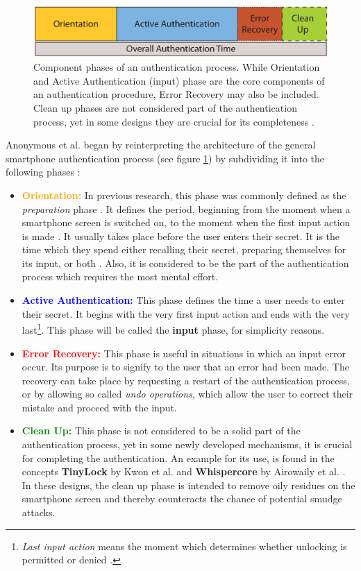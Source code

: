 \begin{figure}[t!]
\centering
\includegraphics[width=13cm, height=2cm]{Chapters/graphics/Phases.PNG}
\caption{Component phases of an authentication process. While Orientation and Active Authentication (input) phase are the core components of an authentication procedure, Error Recovery may also be included. Clean up phases are not considered part of the authentication process, yet in some designs they are crucial for its completeness \cite{anonymous}. }
\label{fig:phases}
\end{figure}

Anonymous et al. \cite{anonymous} began by reinterpreting the architecture of the general smartphone authentication process (see figure \ref{fig:phases}) by subdividing it into the following phases \cite{anonymous}: 

\begin{itemize}
    \item \textbf{\textcolor{orange}{Orientation:}} In previous research, this phase was commonly defined as the \textit{preparation} phase . It defines the period, beginning from the moment when a smartphone screen is switched on, to the moment when the first input action is made . It usually takes place before the user enters their secret. It is the time which they spend either recalling their secret, preparing themselves for its input, or both . Also, it is considered to be the part of the authentication process which requires the most mental effort.  
    \item \textbf{\textcolor{blue}{Active Authentication:}} This phase defines the time a user needs to enter their secret. It begins with the very first input action and ends with the very last\footnote{ \textit{Last input action} means the moment which determines whether unlocking is permitted or denied \cite{anonymous}.}. This phase will be called the \textbf{input} phase, for simplicity reasons.
    \item \textbf{\textcolor{red}{Error Recovery:}} This phase is useful in situations in which an input error occur. Its purpose is to signify to the user that an error had been made. The recovery can take place by requesting a restart of the authentication process, or by allowing so called \textit{undo operations}, which allow the user to correct their mistake and proceed with the input. 
    \item \textbf{\textcolor{green}{Clean Up:}} This phase is not considered to be a solid part of the authentication process, yet in some newly developed mechanisms, it is crucial for completing the authentication. An example for its use, is found in the concepts \textbf{TinyLock} by Kwon et al. \cite{kwon} and \textbf{Whispercore} by Airowaily et al. \cite{Airowaily}. In these designs, the clean up phase is intended to remove oily residues on the smartphone screen and thereby counteracts the chance of potential smudge attacks. 
\end{itemize}

